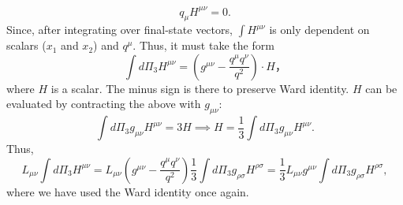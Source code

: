 \documentclass[11pt]{article}
\theoremstyle{definition}
\begin{document}
\begin{equation}
    q_\mu H^{\mu\nu}=0.
\end{equation}
Since, after integrating over final-state vectors, $\int H^{\mu\nu}$ is only dependent on scalars ($x_1$ and $x_2$) and $q^\mu$. Thus, it must take the form
\begin{equation}
    \int d\Pi_3 H^{\mu\nu} = \left(g^{\mu\nu} - \frac{q^\mu q^\nu}{q^2}\right)\cdot H，
\end{equation}
where $H$ is a scalar. The minus sign is there to preserve Ward identity. $H$ can be evaluated by contracting the above with $g_{\mu\nu}$:
\begin{equation}
    \int d\Pi_3 g_{\mu\nu}H^{\mu\nu} = 3H \implies H = \frac{1}{3}\int d\Pi_3 g_{\mu\nu}H^{\mu\nu}.
\end{equation}
Thus, 
\begin{equation}
    L_{\mu\nu}\int d\Pi_3 H^{\mu\nu} = L_{\mu\nu}\left(g^{\mu\nu} - \frac{q^\mu q^\nu}{q^2}\right)\frac{1}{3}\int d\Pi_3 g_{\rho\sigma}H^{\rho\sigma} = \frac{1}{3}L_{\mu\nu}g^{\mu\nu}\int d\Pi_3 g_{\rho\sigma}H^{\rho\sigma},
\end{equation}
where we have used the Ward identity once again.
\end{document}

